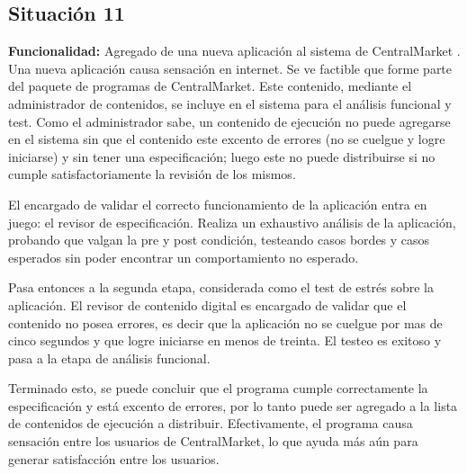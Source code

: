 \documentclass[11pt, a4paper, spanish]{article}
\begin{document}
\subsection{Situaci\'on 11}

	\textbf{Funcionalidad:} Agregado de una nueva aplicaci\'on al sistema de CentralMarket .\\

	Una nueva aplicaci\'on causa sensaci\'on en internet. Se ve factible que forme parte del paquete de programas de CentralMarket. Este contenido, 
   mediante el administrador de contenidos, se incluye en el sistema para el an\'alisis funcional y test. Como el administrador sabe, un contenido de 
   ejecuci\'on no puede agregarse en el sistema sin que el contenido este excento de errores (no se cuelgue y logre iniciarse) y sin tener una 
   especificaci\'on; luego este no puede distribuirse si no cumple satisfactoriamente la revisi\'on de los mismos.

	El encargado de validar el correcto funcionamiento de la aplicaci\'on entra en juego: el revisor de especificaci\'on. Realiza un exhaustivo 
   an\'alisis de la aplicaci\'on, probando que valgan la pre y post condici\'on, testeando casos bordes y casos esperados sin poder encontrar un 
   comportamiento no esperado.

	Pasa entonces a la segunda etapa, considerada como el test de estr\'es sobre la aplicaci\'on. El revisor de contenido digital es encargado de 
   validar que el contenido no posea errores, es decir que la aplicaci\'on no se cuelgue por mas de cinco segundos y que logre iniciarse en menos de 
   treinta. El testeo es exitoso y pasa a la etapa de an\'alisis funcional.

	Terminado esto, se puede concluir que el programa cumple correctamente la especificaci\'on y est\'a excento de errores, por lo tanto puede ser 
   agregado a la lista de contenidos de ejecuci\'on a distribuir.
        Efectivamente, el programa causa sensaci\'on entre los usuarios de CentralMarket, lo que ayuda m\'as a\'un para generar satisfacci\'on entre los 
   usuarios.
\end{document}
